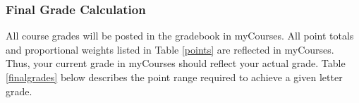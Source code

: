 \documentclass[article]{article}
\begin{document}
%
%
%
%
%
%

\subsubsection{Final Grade Calculation}
All course grades will be posted in the gradebook in myCourses. All point totals and proportional weights listed in Table \ref{points} are reflected in myCourses. Thus, your current grade in myCourses should reflect your actual grade. Table \ref{finalgrades} below describes the point range required to achieve a given letter grade.
\end{document}
